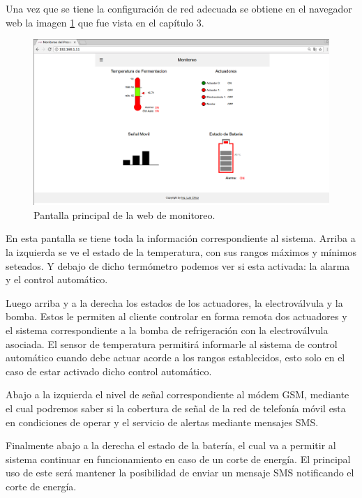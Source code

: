 Una vez que se tiene la configuración de red adecuada se obtiene en el navegador web la imagen \ref{fig:web_monitoreo} que fue vista en el capítulo 3.

\begin{figure}[h]
  \centering
  \includegraphics[scale=.25]{./Figures/web_monitoreo.png}
  \caption{Pantalla principal de la web de monitoreo.}
  \label{fig:web_monitoreo}
\end{figure}

En esta pantalla se tiene toda la información correspondiente al sistema. 
Arriba a la izquierda se ve el estado de la temperatura, con sus rangos máximos y mínimos seteados. Y debajo de dicho termómetro podemos ver si esta activada: la alarma y el control automático.

Luego arriba y a la derecha los estados de los actuadores, la electroválvula y la bomba. Estos le permiten al cliente controlar en forma remota dos actuadores y el sistema correspondiente a la bomba de refrigeración con la electroválvula asociada. El sensor de temperatura permitirá informarle al sistema de control automático cuando debe actuar acorde a los rangos establecidos, esto solo en el caso de estar activado dicho control automático. 

Abajo a la izquierda el nivel de señal correspondiente al módem GSM, mediante el cual podremos saber si la cobertura de señal de la red de telefonía móvil esta en condiciones de operar y el servicio de alertas mediante mensajes SMS. 

Finalmente abajo a la derecha el estado de la batería, el cual va a permitir al sistema continuar en funcionamiento en caso de un corte de energía. El principal uso de este será mantener la posibilidad de enviar un mensaje SMS notificando el corte de energía.



